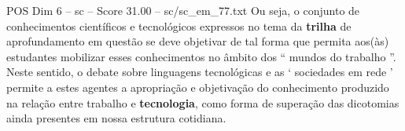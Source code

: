 \begin{textsample}{POS Dim 6 – sc – Score 31.00 – sc/sc\_em\_77.txt}
Ou seja, o conjunto de conhecimentos científicos e tecnológicos expressos no tema da \textbf{trilha} de aprofundamento em questão se deve objetivar de tal forma que permita aos(às) estudantes mobilizar esses conhecimentos no âmbito dos “ mundos do trabalho ”.
Neste sentido, o debate sobre linguagens tecnológicas e as ‘ sociedades em rede ’ permite a estes agentes a apropriação e objetivação do conhecimento produzido na relação entre trabalho e \textbf{tecnologia}, como forma de superação das dicotomias ainda presentes em nossa estrutura cotidiana.

\end{textsample}

